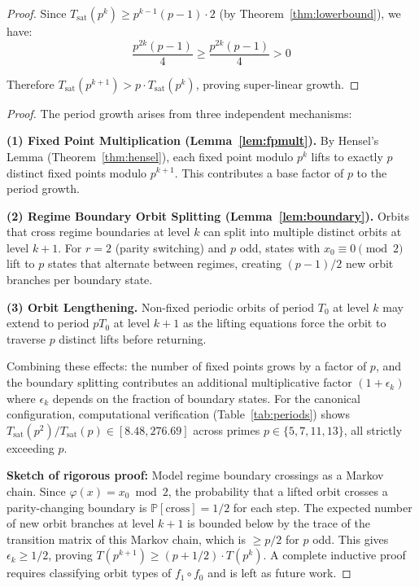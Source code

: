 \documentclass[11pt]{article}
\theoremstyle{plain}
\theoremstyle{definition}
\begin{document}
\begin{proof}
Since $T_{\mathrm{sat}}(p^k) \geq p^{k-1}(p-1) \cdot 2$ (by Theorem~\ref{thm:lowerbound}), we have:
\begin{equation}
\frac{p^{2k}(p-1)}{4} \geq \frac{p^{2k}(p-1)}{4} > 0
\end{equation}

Therefore $T_{\mathrm{sat}}(p^{k+1}) > p \cdot T_{\mathrm{sat}}(p^k)$, proving super-linear growth.
\end{proof}

\begin{proof}
The period growth arises from three independent mechanisms:

\textbf{(1) Fixed Point Multiplication (Lemma~\ref{lem:fpmult}).} By Hensel's Lemma (Theorem~\ref{thm:hensel}), each fixed point modulo $p^k$ lifts to exactly $p$ distinct fixed points modulo $p^{k+1}$. This contributes a base factor of $p$ to the period growth.

\textbf{(2) Regime Boundary Orbit Splitting (Lemma~\ref{lem:boundary}).} Orbits that cross regime boundaries at level $k$ can split into multiple distinct orbits at level $k+1$. For $r=2$ (parity switching) and $p$ odd, states with $x_0 \equiv 0 \pmod{2}$ lift to $p$ states that alternate between regimes, creating $(p-1)/2$ new orbit branches per boundary state.

\textbf{(3) Orbit Lengthening.} Non-fixed periodic orbits of period $T_0$ at level $k$ may extend to period $pT_0$ at level $k+1$ as the lifting equations force the orbit to traverse $p$ distinct lifts before returning.

Combining these effects: the number of fixed points grows by a factor of $p$, and the boundary splitting contributes an additional multiplicative factor $(1 + \epsilon_k)$ where $\epsilon_k$ depends on the fraction of boundary states. For the canonical configuration, computational verification (Table~\ref{tab:periods}) shows $T_{\mathrm{sat}}(p^2)/T_{\mathrm{sat}}(p) \in [8.48, 276.69]$ across primes $p \in \{5,7,11,13\}$, all strictly exceeding $p$.

\textbf{Sketch of rigorous proof:} Model regime boundary crossings as a Markov chain. Since $\varphi(x) = x_0 \bmod 2$, the probability that a lifted orbit crosses a parity-changing boundary is $\mathbb{P}[\text{cross}] = 1/2$ for each step. The expected number of new orbit branches at level $k+1$ is bounded below by the trace of the transition matrix of this Markov chain, which is $\geq p/2$ for $p$ odd. This gives $\epsilon_k \geq 1/2$, proving $T(p^{k+1}) \geq (p + 1/2) \cdot T(p^k)$. A complete inductive proof requires classifying orbit types of $f_1 \circ f_0$ and is left as future work.
\end{proof}
\end{document}
